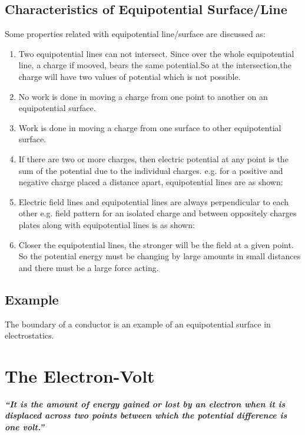 \subsection{Characteristics of Equipotential Surface/Line}
Some properties related with equipotential line/surface are discussed as:
\begin{enumerate}[label = (\roman*)]
\item Two equipotential lines can not intersect.
Since over the whole equipotential line, a charge if mooved,
bears the same potential.So at the intersection,the charge
will have two values of potential which is not possible.
\item No work is done in moving a charge from one point to another on
an equipotential surface.
\item Work is done in moving a charge from one surface to other
equipotential surface.
\item If there are two or more charges, then electric potential at
any point is the sum of the potential due to the individual charges.
e.g. for a positive and negative charge placed a distance apart,
equipotential lines are as shown:
\item Electric field lines and equipotential lines are always 
perpendicular to each other e.g. field pattern for an isolated
charge and between oppositely charges plates along with equipotential
lines is as shown:
\item Closer the equipotential lines,
the stronger will be the field at a given point.
So the potential energy must be changing by large amounts in
small distances and there must be a large force acting.
\end{enumerate}
\subsection*{Example}
The boundary of a conductor is an example of
an equipotential surface in electrostatics.
\section{The Electron-Volt}
\textit{\textbf{“It is the amount of energy gained or lost by an electron when it is displaced
across two points between which the potential difference is one volt.”}}
